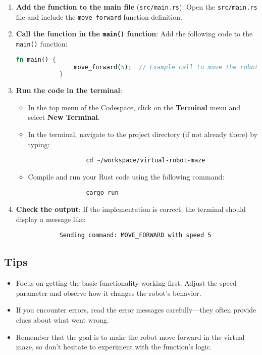 \documentclass{article}
\begin{document}
	\begin{enumerate}
		\item \textbf{Add the function to the main file} (\texttt{src/main.rs}):
		Open the \texttt{src/main.rs} file and include the \texttt{move\_forward} function definition.
		
		\item \textbf{Call the function in the \texttt{main()} function}:
		Add the following code to the \texttt{main()} function:
		\begin{lstlisting}[language=Rust, caption={Calling move\_forward in the main function}]
			fn main() {
				move_forward(5);  // Example call to move the robot forward at speed 5
			}
		\end{lstlisting}
		
		\item \textbf{Run the code in the terminal}:
		\begin{itemize}
			\item In the top menu of the Codespace, click on the \textbf{Terminal} menu and select \textbf{New Terminal}.
			\item In the terminal, navigate to the project directory (if not already there) by typing:
			\begin{lstlisting}
				cd ~/workspace/virtual-robot-maze
			\end{lstlisting}
			\item Compile and run your Rust code using the following command:
			\begin{lstlisting}
				cargo run
			\end{lstlisting}
		\end{itemize}
		
		\item \textbf{Check the output}:
		If the implementation is correct, the terminal should display a message like:
		\begin{lstlisting}
			Sending command: MOVE_FORWARD with speed 5
		\end{lstlisting}
	\end{enumerate}
	
	\subsection*{Tips}
	\begin{itemize}
		\item Focus on getting the basic functionality working first. Adjust the speed parameter and observe how it changes the robot's behavior.
		\item If you encounter errors, read the error messages carefully—they often provide clues about what went wrong.
		\item Remember that the goal is to make the robot move forward in the virtual maze, so don’t hesitate to experiment with the function’s logic.
	\end{itemize}
	
\end{document}
